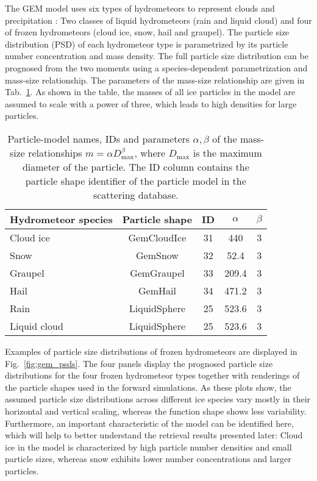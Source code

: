 \documentclass[journal abbreviation, manuscript]{copernicus}
\begin{document}
The GEM model uses six types of hydrometeors to represent clouds and
precipitation \citep{milbrandtyau05}: Two classes of liquid hydrometeors (rain
and liquid cloud) and four of frozen hydrometeors (cloud ice, snow, hail and
graupel). The particle size distribution (PSD) of each hydrometeor type is
parametrized by its particle number concentration and mass density. The full
particle size distribution can be prognosed from the two moments using a
species-dependent parametrization and mass-size relationship. The parameters of
the mass-size relationship are given in Tab.~\ref{tab:species_parameters}. As
shown in the table, the masses of all ice particles in the model are
assumed to scale with a power of three, which leads to high densities for
large particles.

\begin{table}
  \centering
  \caption{Particle-model names, IDs and parameters $\alpha, \beta$ of the
    mass-size relationships $m = \alpha D_\text{max}^\beta$, where
    $D_\text{max}$ is the maximum diameter of the particle. The ID column
    contains the particle shape identifier of the particle model in the
    \citet{eriksson18} scattering database.}
  \label{tab:species_parameters}
  \begin{tabular}{l|c|c|c|c}
    Hydrometeor species & Particle shape & ID & $\alpha$ & $\beta$ \\
    \hline
    Cloud ice    & GemCloudIce  & 31 & 440   & 3 \\
    Snow         & GemSnow      & 32 & 52.4  & 3 \\
    Graupel      & GemGraupel   & 33 & 209.4 & 3 \\
    Hail         & GemHail      & 34 & 471.2 & 3 \\
    Rain         & LiquidSphere & 25 & 523.6 & 3 \\
    Liquid cloud & LiquidSphere & 25 & 523.6 & 3 \\
  \end{tabular}
\end{table}

Examples of particle size distributions of frozen hydrometeors are displayed in
Fig.~\ref{fig:gem_psds}. The four panels display the prognosed particle size
distributions for the four frozen hydrometeor types together with renderings of
the particle shapes used in the forward simulations. As these plots show, the
assumed particle size distributions across different ice species vary mostly in
their horizontal and vertical scaling, whereas the function shape shows less
variability. Furthermore, an important characteristic of the model can be
identified here, which will help to better understand the retrieval results
presented later: Cloud ice in the model is characterized by high particle number
densities and small particle sizes, whereas snow exhibits lower number
concentrations and larger particles.
\end{document}
